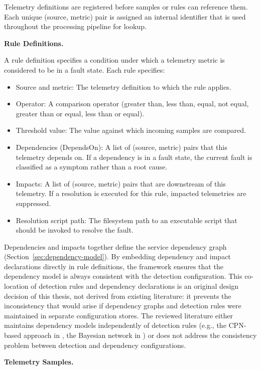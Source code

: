 Telemetry definitions are registered before samples or rules can reference them. Each unique (source, metric) pair is assigned an internal identifier that is used throughout the processing pipeline for lookup.

\textbf{Rule Definitions.}

A rule definition specifies a condition under which a telemetry metric is considered to be in a fault state. Each rule specifies:

\begin{itemize}
\item Source and metric: The telemetry definition to which the rule applies.
\item Operator: A comparison operator (greater than, less than, equal, not equal, greater than or equal, less than or equal).
\item Threshold value: The value against which incoming samples are compared.
\item Dependencies (DependsOn): A list of (source, metric) pairs that this telemetry depends on. If a dependency is in a fault state, the current fault is classified as a symptom rather than a root cause.
\item Impacts: A list of (source, metric) pairs that are downstream of this telemetry. If a resolution is executed for this rule, impacted telemetries are suppressed.
\item Resolution script path: The filesystem path to an executable script that should be invoked to resolve the fault.
\end{itemize}

Dependencies and impacts together define the service dependency graph (Section~\ref{sec:dependency-model}). By embedding dependency and impact declarations directly in rule definitions, the framework ensures that the dependency model is always consistent with the detection configuration. This co-location of detection rules and dependency declarations is an original design decision of this thesis, not derived from existing literature: it prevents the inconsistency that would arise if dependency graphs and detection rules were maintained in separate configuration stores. The reviewed literature either maintains dependency models independently of detection rules (e.g., the CPN-based approach in \cite{ref10}, the Bayesian network in \cite{ref12}) or does not address the consistency problem between detection and dependency configurations.

\textbf{Telemetry Samples.}

